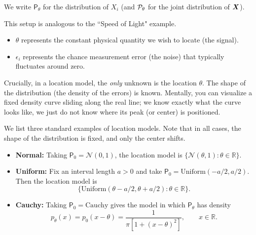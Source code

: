 We write \(\mathsf{P}_{\theta}\) for the distribution of \(X_i\) (and \(\mathcal{P}_{\theta}\) for the joint distribution of \(\boldsymbol{X}\)).

\begin{note}
This setup is analogous to the ``Speed of Light" example. 
\begin{itemize}
    \item \(\theta\) represents the constant physical quantity we wish to locate (the signal).
    \item \(\epsilon_i\) represents the chance measurement error (the noise) that typically fluctuates around zero.
\end{itemize}
Crucially, in a location model, the \textit{only} unknown is the location \(\theta\). The shape of the distribution (the density of the errors) is known. Mentally, you can visualize a fixed density curve sliding along the real line; we know exactly what the curve looks like, we just do not know where its peak (or center) is positioned.
\end{note}

\medskip
\begin{ex}
We list three standard examples of location models. Note that in all cases, the shape of the distribution is fixed, and only the center shifts.
\begin{itemize}
    \item \textbf{Normal:} Taking \(\mathsf{P}_0 = \mathcal{N}(0, 1)\), the location model is
          \(\{\mathcal{N}(\theta, 1) : \theta \in \mathbb{R}\}\).
    \item \textbf{Uniform:} Fix an interval length \(a > 0\) and take
          \(\mathsf{P}_0 = \text{Uniform}(-a/2, a/2)\). Then the location model is
          \[\{\text{Uniform}(\theta - a/2, \theta + a/2) : \theta \in \mathbb{R}\}.\]
    \item \textbf{Cauchy:} Taking \(\mathsf{P}_0 = \text{Cauchy}\) gives the model in which \(\mathsf{P}_\theta\) has density
          \[p_{\theta}(x) = p_0(x - \theta) = \frac{1}{\pi \left[1 + (x - \theta)^2\right]}, \qquad x \in \mathbb{R}.\]
\end{itemize}
\end{ex}

